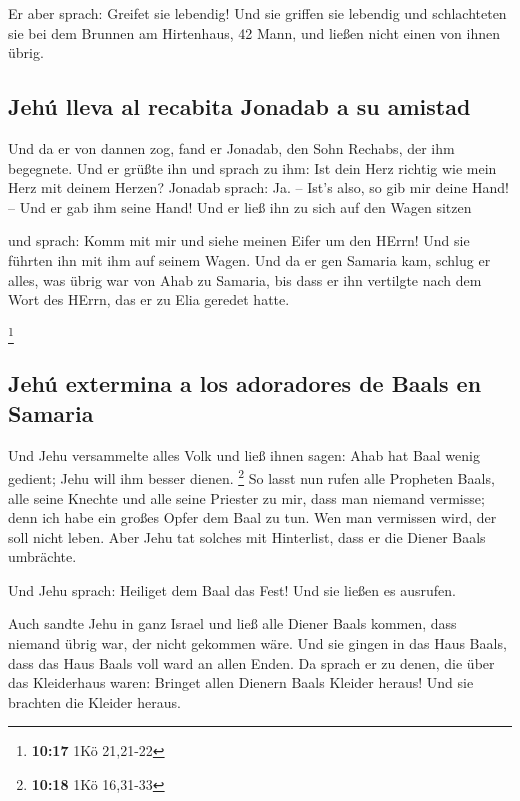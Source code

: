  Er aber sprach: Greifet sie lebendig! Und sie griffen
sie lebendig und schlachteten sie bei dem Brunnen am Hirtenhaus, 42
Mann, und ließen nicht einen von ihnen übrig.

\hypertarget{jehuxfa-lleva-al-recabita-jonadab-a-su-amistad}{%
\subsection{Jehú lleva al recabita Jonadab a su
amistad}\label{jehuxfa-lleva-al-recabita-jonadab-a-su-amistad}}

 Und da er von dannen zog, fand er Jonadab, den Sohn
Rechabs, der ihm begegnete. Und er grüßte ihn und sprach zu ihm: Ist
dein Herz richtig wie mein Herz mit deinem Herzen? Jonadab sprach: Ja.
-- Ist's also, so gib mir deine Hand! -- Und er gab ihm seine Hand! Und
er ließ ihn zu sich auf den Wagen sitzen

 und sprach: Komm mit mir und siehe meinen Eifer um den
HErrn! Und sie führten ihn mit ihm auf seinem Wagen.  Und
da er gen Samaria kam, schlug er alles, was übrig war von Ahab zu
Samaria, bis dass er ihn vertilgte nach dem Wort des HErrn, das er zu
Elia geredet hatte.

\footnote{\textbf{10:17} 1Kö 21,21-22}

\hypertarget{jehuxfa-extermina-a-los-adoradores-de-baals-en-samaria}{%
\subsection{Jehú extermina a los adoradores de Baals en
Samaria}\label{jehuxfa-extermina-a-los-adoradores-de-baals-en-samaria}}

 Und Jehu versammelte alles Volk und ließ ihnen sagen:
Ahab hat Baal wenig gedient; Jehu will ihm besser dienen. \footnote{\textbf{10:18}
  1Kö 16,31-33}  So lasst nun rufen alle Propheten Baals,
alle seine Knechte und alle seine Priester zu mir, dass man niemand
vermisse; denn ich habe ein großes Opfer dem Baal zu tun. Wen man
vermissen wird, der soll nicht leben. Aber Jehu tat solches mit
Hinterlist, dass er die Diener Baals umbrächte.

 Und Jehu sprach: Heiliget dem Baal das Fest! Und sie
ließen es ausrufen.

 Auch sandte Jehu in ganz Israel und ließ alle Diener
Baals kommen, dass niemand übrig war, der nicht gekommen wäre. Und sie
gingen in das Haus Baals, dass das Haus Baals voll ward an allen Enden.
 Da sprach er zu denen, die über das Kleiderhaus waren:
Bringet allen Dienern Baals Kleider heraus! Und sie brachten die Kleider
heraus.

